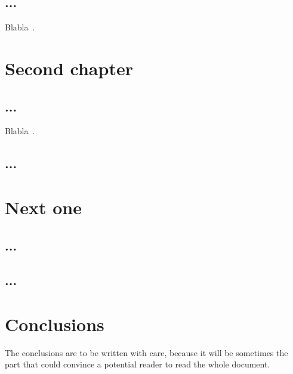 \documentclass[11pt,a4paper,oneside]{book}
\begin{document}
\section{...}Blabla~\cite{ref2}.

\chapter{Second chapter}

\label{chap2}

\section{...}Blabla~\cite{ref4}.

\section{...}
\label{sec-untel}

\chapter{Next one}

\section{...}

\section{...}

\chapter*{Conclusions}

The conclusions are to be written with care, because it will be sometimes the part that could convince a potential reader to read the whole document.

\appendix

\backmatter

\printindex %



\end{document}
